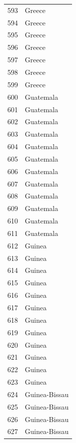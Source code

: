 \documentclass[
  letterpaper,
  DIV=11,
  numbers=noendperiod]{scrreprt}
\begin{document}
\begin{tabular}{ll}
593  &                    Greece \\
594  &                    Greece \\
595  &                    Greece \\
596  &                    Greece \\
597  &                    Greece \\
598  &                    Greece \\
599  &                    Greece \\
600  &                 Guatemala \\
601  &                 Guatemala \\
602  &                 Guatemala \\
603  &                 Guatemala \\
604  &                 Guatemala \\
605  &                 Guatemala \\
606  &                 Guatemala \\
607  &                 Guatemala \\
608  &                 Guatemala \\
609  &                 Guatemala \\
610  &                 Guatemala \\
611  &                 Guatemala \\
612  &                    Guinea \\
613  &                    Guinea \\
614  &                    Guinea \\
615  &                    Guinea \\
616  &                    Guinea \\
617  &                    Guinea \\
618  &                    Guinea \\
619  &                    Guinea \\
620  &                    Guinea \\
621  &                    Guinea \\
622  &                    Guinea \\
623  &                    Guinea \\
624  &             Guinea-Bissau \\
625  &             Guinea-Bissau \\
626  &             Guinea-Bissau \\
627  &             Guinea-Bissau \\

\end{tabular}
\end{document}
